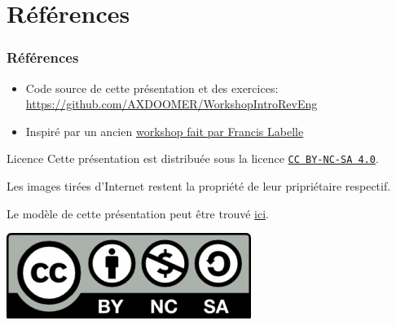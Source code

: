 \documentclass[10pt,xcolor={table,dvipsnames},t]{beamer}
\begin{document}
\section{Références}

\begin{frame}
    \frametitle{Références}
    \begin{itemize}
        \item Code source de cette présentation et des exercices: \url{https://github.com/AXDOOMER/WorkshopIntroRevEng}
        \item Inspiré par un ancien \href{https://dciets.com/dci-workshop/security/2017/09/13/re/}{workshop fait par Francis Labelle}
    \end{itemize}
    
    \begin{block}{Licence}
        Cette présentation est distribuée sous la licence 
        \href{https://creativecommons.org/licenses/by-nc-sa/4.0/deed.fr}{\texttt{CC BY-NC-SA 4.0}}.
        
        Les images tirées d'Internet restent la propriété de leur pripriétaire respectif. 
        
        Le modèle de cette présentation peut être trouvé 
        \href{https://www.overleaf.com/latex/templates/uc-berkeley-beamer-theme/bywswngntrws}{ici}.
        
        \begin{center}
            \includegraphics[width=.20\textwidth,height=.10\textheight]{rect-by-nc-sa-300x105}
        \end{center}
    \end{block}
\end{frame}
\end{document}
